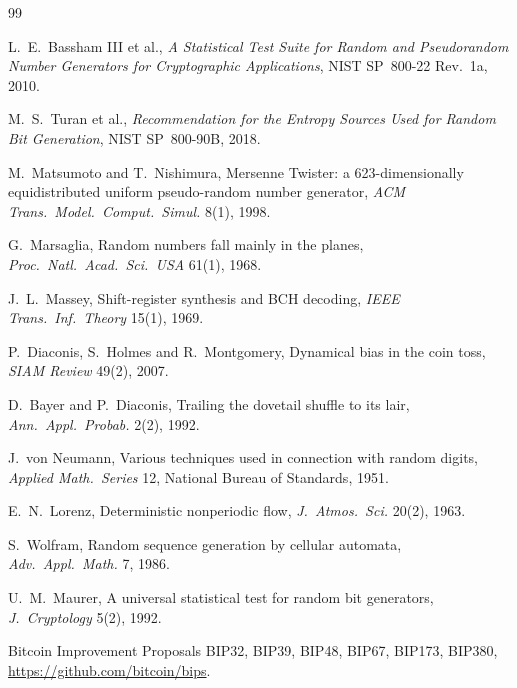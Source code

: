 \documentclass[11pt,a4paper]{article}
\theoremstyle{plain}
\theoremstyle{definition}
\begin{document}
\begin{thebibliography}{99}

 L.~E.~Bassham III et al., \emph{A Statistical Test Suite for
Random and Pseudorandom Number Generators for Cryptographic Applications},
NIST SP~800-22 Rev.~1a, 2010.

 M.~S.~Turan et al., \emph{Recommendation for the Entropy
Sources Used for Random Bit Generation}, NIST SP~800-90B, 2018.

 M.~Matsumoto and T.~Nishimura, Mersenne Twister: a
623-dimensionally equidistributed uniform pseudo-random number generator,
\emph{ACM Trans.\ Model.\ Comput.\ Simul.} 8(1), 1998.

 G.~Marsaglia, Random numbers fall mainly in the planes,
\emph{Proc.\ Natl.\ Acad.\ Sci.\ USA} 61(1), 1968.

 J.~L.~Massey, Shift-register synthesis and BCH decoding,
\emph{IEEE Trans.\ Inf.\ Theory} 15(1), 1969.

 P.~Diaconis, S.~Holmes and R.~Montgomery, Dynamical bias in the
coin toss, \emph{SIAM Review} 49(2), 2007.

 D.~Bayer and P.~Diaconis, Trailing the dovetail shuffle to its
lair, \emph{Ann.\ Appl.\ Probab.} 2(2), 1992.

 J.~von Neumann, Various techniques used in connection with random
digits, \emph{Applied Math.\ Series} 12, National Bureau of Standards, 1951.

 E.~N.~Lorenz, Deterministic nonperiodic flow,
\emph{J.\ Atmos.\ Sci.} 20(2), 1963.

 S.~Wolfram, Random sequence generation by cellular automata,
\emph{Adv.\ Appl.\ Math.} 7, 1986.

 U.~M.~Maurer, A universal statistical test for random bit
generators, \emph{J.\ Cryptology} 5(2), 1992.

 Bitcoin Improvement Proposals BIP32, BIP39, BIP48, BIP67, BIP173,
BIP380, \url{https://github.com/bitcoin/bips}.

\end{thebibliography}
\end{document}
